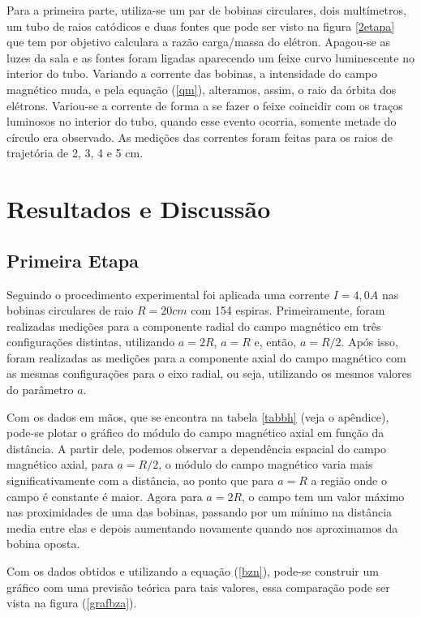 \documentclass{article}
\begin{document}
Para a primeira parte, utiliza-se um par de bobinas circulares, dois multímetros, um tubo de raios catódicos e duas fontes que pode ser visto na figura \ref{2etapa} que tem por objetivo calculara a razão carga/massa do elétron. Apagou-se as luzes da sala e as fontes foram ligadas aparecendo um feixe curvo luminescente no interior do tubo. Variando a corrente das bobinas, a intensidade do campo magnético muda, e pela equação (\ref{qm}), alteramos, assim, o raio da órbita dos elétrons. Variou-se a corrente de forma a se fazer o feixe coincidir com os traços luminosos no interior do tubo, quando esse evento ocorria, somente metade do círculo era observado. As medições das correntes foram feitas para os raios de trajetória de 2, 3, 4 e 5 cm. 

\section{Resultados e Discussão}

\subsection{Primeira Etapa}

Seguindo o procedimento experimental foi aplicada uma corrente $I = 4,0 A$ nas bobinas
circulares de raio $R = 20 cm$ com 154 espiras. Primeiramente, foram realizadas medições para
a componente radial do campo magnético em três configurações distintas, utilizando $a = 2R$,
$a = R$ e, então, $a = R/2$. Após isso, foram realizadas as medições para a componente axial
do campo magnético com as mesmas configurações para o eixo radial, ou seja, utilizando os
mesmos valores do parâmetro $a$. 

Com os dados em mãos, que se encontra na tabela \ref{tabbh} (veja o apêndice), pode-se plotar o gráfico do módulo do campo magnético axial em função da distância. A partir dele, podemos observar a dependência espacial do campo magnético axial, para $a = R/2$, o módulo do campo magnético varia mais significativamente com a distância, ao ponto que para $a = R$ a região onde o campo é constante é maior. Agora para $a = 2R$, o campo tem um valor máximo nas proximidades de uma das bobinas, passando por um mínimo na distância media entre elas e depois aumentando novamente quando nos aproximamos da bobina oposta.

Com os dados obtidos e utilizando a equação (\ref{bzn}), pode-se construir um gráfico com uma previsão teórica para tais valores, essa comparação pode ser vista na figura (\ref{grafbza}).
\end{document}

